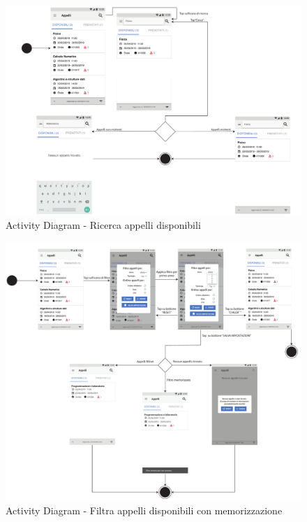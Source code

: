 \begin{figure}
	\centering
	\includegraphics[width=6in]{imgs/gruppo1/activity_diagrams/AD8_Ricerca_appelli.pdf}
	\caption{Activity Diagram - Ricerca appelli disponibili}
	\label{diag:ricercaAppelliDisponibiliAD}
\end{figure}
\newpage

\begin{figure}
	\centering
	\includegraphics[width=6in]{imgs/gruppo1/activity_diagrams/AD9_filtrati_appelli.pdf}
	\caption{Activity Diagram - Filtra appelli disponibili con memorizzazione}
	\label{diag:filtraAppelliDisponibiliConMemAD}
\end{figure}
\newpage

